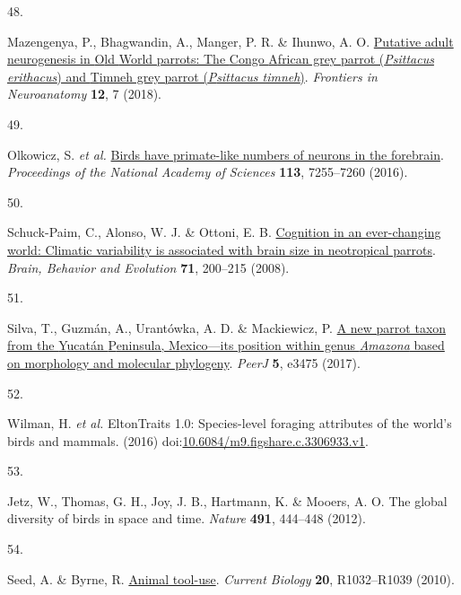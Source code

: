 \documentclass[
  man,floatsintext]{apa6}
\newlength{\cslhangindent}
\newlength{\csllabelwidth}
\newlength{\cslentryspacingunit} %
\newenvironment{CSLReferences}[2] %
 {%
  \setlength{\parindent}{0pt}
  \ifodd #1
  \let\oldpar\par
  \def\par{\hangindent=\cslhangindent\oldpar}
  \fi
  \setlength{\parskip}{#2\cslentryspacingunit}
 }%
 {}
\newcommand{\CSLLeftMargin}[1]{\parbox[t]{\csllabelwidth}{#1}}
\newcommand{\CSLRightInline}[1]{\parbox[t]{\linewidth - \csllabelwidth}{#1}\break}
\begin{document}
\begin{CSLReferences}{0}{0}
\leavevmode{}%
\CSLLeftMargin{48. }%
\CSLRightInline{Mazengenya, P., Bhagwandin, A., Manger, P. R. \& Ihunwo, A. O. \href{https://doi.org/10.3389/fnana.2018.00007}{Putative adult neurogenesis in {O}ld {W}orld parrots: The {C}ongo {A}frican grey parrot (\emph{{P}sittacus erithacus}) and {T}imneh grey parrot (\emph{{P}sittacus timneh})}. \emph{Frontiers in Neuroanatomy} \textbf{12}, 7 (2018).}

\leavevmode{}%
\CSLLeftMargin{49. }%
\CSLRightInline{Olkowicz, S. \emph{et al.} \href{https://doi.org/10.1073/pnas.1517131113}{Birds have primate-like numbers of neurons in the forebrain}. \emph{Proceedings of the National Academy of Sciences} \textbf{113}, 7255--7260 (2016).}

\leavevmode{}%
\CSLLeftMargin{50. }%
\CSLRightInline{Schuck-Paim, C., Alonso, W. J. \& Ottoni, E. B. \href{https://doi.org/10.1159/000119710}{Cognition in an ever-changing world: Climatic variability is associated with brain size in neotropical parrots}. \emph{Brain, Behavior and Evolution} \textbf{71}, 200--215 (2008).}

\leavevmode{}%
\CSLLeftMargin{51. }%
\CSLRightInline{Silva, T., Guzmán, A., Urantówka, A. D. \& Mackiewicz, P. \href{https://doi.org/10.7717/peerj.3475}{A new parrot taxon from the {Y}ucat{á}n {P}eninsula, {M}exico---its position within genus \emph{{A}mazona} based on morphology and molecular phylogeny}. \emph{PeerJ} \textbf{5}, e3475 (2017).}

\leavevmode{}%
\CSLLeftMargin{52. }%
\CSLRightInline{Wilman, H. \emph{et al.} EltonTraits 1.0: Species-level foraging attributes of the world's birds and mammals. (2016) doi:\href{https://doi.org/10.6084/m9.figshare.c.3306933.v1}{10.6084/m9.figshare.c.3306933.v1}.}

\leavevmode{}%
\CSLLeftMargin{53. }%
\CSLRightInline{Jetz, W., Thomas, G. H., Joy, J. B., Hartmann, K. \& Mooers, A. O. The global diversity of birds in space and time. \emph{Nature} \textbf{491}, 444--448 (2012).}

\leavevmode{}%
\CSLLeftMargin{54. }%
\CSLRightInline{Seed, A. \& Byrne, R. \href{https://doi.org/10.1016/j.cub.2010.09.042}{Animal tool-use}. \emph{Current Biology} \textbf{20}, R1032--R1039 (2010).}


\end{CSLReferences}
\end{document}
